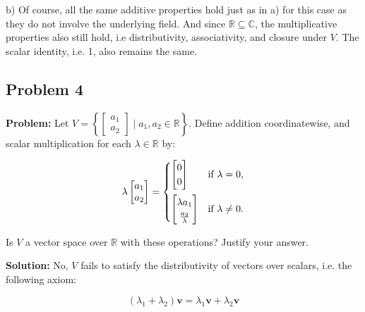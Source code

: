 \documentclass{article}
\renewcommand\vec{\mathbf}
\begin{document}
b) Of course, all the same additive properties hold just as in a) for this case as they do not involve the underlying field. And since $\mathbb R\subseteq \mathbb C$, the multiplicative properties also still hold, i.e distributivity, associativity, and closure under $V$. The scalar identity, i.e. 1, also remains the same.

\subsection*{Problem 4}
\noindent\textbf{Problem:} Let $V = \left\{\begin{bmatrix}
    a_1 \\
    a_2
\end{bmatrix}\mid a_1, a_2\in\mathbb R\right\}$. Define addition coordinatewise, and scalar multiplication for each $\lambda\in\mathbb R$ by:

\[\lambda\begin{bmatrix}
    a_1 \\
    a_2
\end{bmatrix}=\begin{cases} 
    \begin{bmatrix}
        0 \\
        0
    \end{bmatrix} & \text{if }\lambda=0,\vspace{5pt}\\
    \begin{bmatrix}
        \lambda a_1 \\
        \frac{a_2}{\lambda}
    \end{bmatrix} & \text{if }\lambda\not=0.
 \end{cases}
\]

Is $V$ a vector space over $\mathbb R$ with these operations? Justify your answer.
\bigskip

\noindent\textbf{Solution:} No, $V$ fails to satisfy the distributivity of vectors over scalars, i.e. the following axiom:

\begin{equation*}
    (\lambda_1+\lambda_2)\vec v=\lambda_1\vec v+\lambda_2\vec v\tag{VS8}
\end{equation*}
\end{document}

